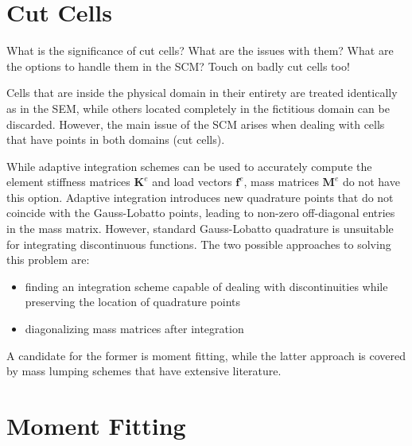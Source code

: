 %
\section{Cut Cells}
\label{section:cutcells}
%

What is the significance of cut cells?
What are the issues with them?
What are the options to handle them in the SCM?
Touch on badly cut cells too!

Cells that are inside the physical domain in their entirety are treated identically as in the SEM, while others located completely in the fictitious domain can be discarded. However, the main issue of the SCM arises when dealing with cells that have points in both domains (cut cells).

While adaptive integration schemes can be used to accurately compute the element stiffness matrices $\mathbf K^e$ and load vectors $\mathbf f^e$, mass matrices $\mathbf M^e$ do not have this option. Adaptive integration introduces new quadrature points that do not coincide with the Gauss-Lobatto points, leading to non-zero off-diagonal entries in the mass matrix. However, standard Gauss-Lobatto quadrature is unsuitable for integrating discontinuous functions. The two possible approaches to solving this problem are:

\begin{itemize}
	\item finding an integration scheme capable of dealing with discontinuities while preserving the location of quadrature points
	\item diagonalizing mass matrices after integration
\end{itemize}

A candidate for the former is moment fitting, while the latter approach is covered by mass lumping schemes that have extensive literature.

%
\section{Moment Fitting}
\label{section:moment_fitting}
%

